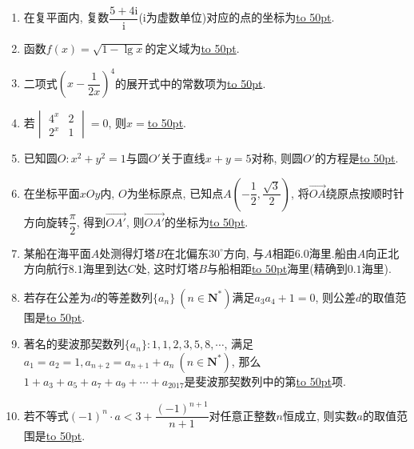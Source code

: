 \documentclass[10pt,a4paper]{article}
\newcommand{\blank}[1]{\underline{\hbox to #1pt{}}}
\begin{document}
\begin{enumerate}[1.]
\item 在复平面内, 复数$\dfrac{5+4\mathrm{i}}{\mathrm{i}}$($\mathrm{i}$为虚数单位)对应的点的坐标为\blank{50}.
\item 函数$f(x)=\sqrt{1-\lg x}$的定义域为\blank{50}.  
\item 二项式$(x-\dfrac1{2x})^4$的展开式中的常数项为\blank{50}.
\item 若$\begin{vmatrix} 4^x & 2 \\ 2^x & 1 \end{vmatrix}=0$, 则$x=$\blank{50}.
\item 已知圆$O:x^2+y^2=1$与圆$O'$关于直线$x+y=5$对称, 则圆$O'$的方程是\blank{50}.
\item 在坐标平面$xOy$内, $O$为坐标原点, 已知点$A(-\dfrac12,\dfrac{\sqrt3}2)$, 将$\overrightarrow{OA}$绕原点按顺时针方向旋转$\dfrac{\pi}2$, 得到$\overrightarrow{OA'}$, 则$\overrightarrow{OA'}$的坐标为\blank{50}.
\item 某船在海平面$A$处测得灯塔$B$在北偏东$30^\circ$方向, 与$A$相距$6.0$海里.船由$A$向正北方向航行$8.1$海里到达$C$处, 这时灯塔$B$与船相距\blank{50}海里(精确到$0.1$海里).
\item 若存在公差为$d$的等差数列$\{a_n\} \ (n\in \mathbf{N}^*)$满足$a_3a_4+1=0$, 则公差$d$的取值范围是\blank{50}.
\item 著名的斐波那契数列$\{a_n\}:1,1,2,3,5,8,\cdots$, 满足$a_1=a_2=1,a_{n+2}=a_{n+1}+a_n \ (n\in \mathbf{N}^*)$, 那么$1+a_3+a_5+a_7+a_9+\cdots+a_{2017}$是斐波那契数列中的第\blank{50}项.
\item 若不等式$(-1)^n\cdot a<3+\dfrac{(-1)^{n+1}}{n+1}$对任意正整数$n$恒成立, 则实数$a$的取值范围是\blank{50}.



\end{enumerate}
\end{document}
